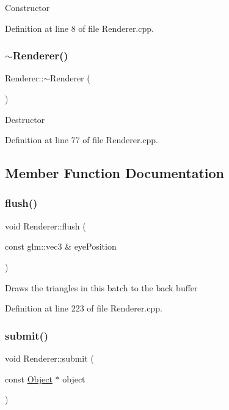 Constructor 

Definition at line 8 of file Renderer.\+cpp.

\mbox{\label{class_renderer_afeee408862d5bd6255a6882d47e6d5cd}} 
\subsubsection{\texorpdfstring{$\sim$\+Renderer()}{~Renderer()}}
{\footnotesize\ttfamily Renderer\+::$\sim$\+Renderer (\begin{DoxyParamCaption}{ }\end{DoxyParamCaption})}

Destructor 

Definition at line 77 of file Renderer.\+cpp.



\subsection{Member Function Documentation}
\mbox{\label{class_renderer_a18316a088e902f0f737c345c860e997d}} 
\subsubsection{\texorpdfstring{flush()}{flush()}}
{\footnotesize\ttfamily void Renderer\+::flush (\begin{DoxyParamCaption}\item[{const glm\+::vec3 \&}]{eye\+Position }\end{DoxyParamCaption})}

Draws the triangles in this batch to the back buffer 

Definition at line 223 of file Renderer.\+cpp.

\mbox{\label{class_renderer_a51ce7e0195b0f751ad65a5f1fe0ad0c4}} 
\subsubsection{\texorpdfstring{submit()}{submit()}}
{\footnotesize\ttfamily void Renderer\+::submit (\begin{DoxyParamCaption}\item[{const \hyperlink{class_object}{Object} $\ast$}]{object }\end{DoxyParamCaption})}

